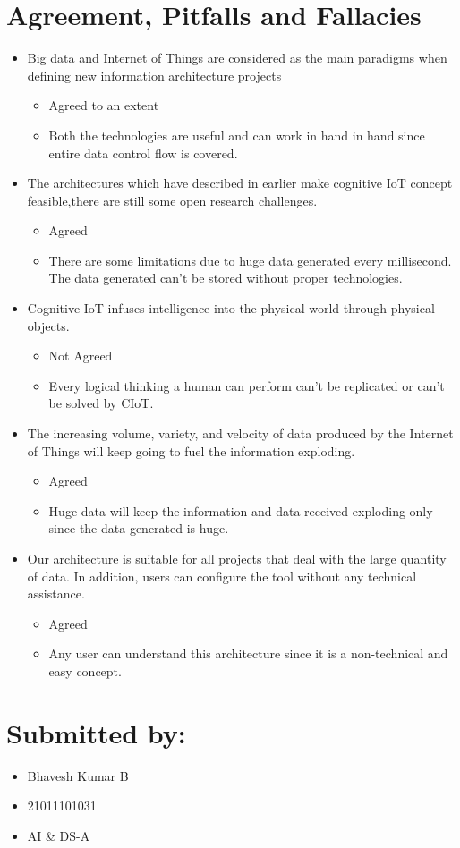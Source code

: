 \documentclass{article}
\begin{document}
\section{Agreement, Pitfalls and Fallacies}
\begin{itemize}
    \item{Big data and Internet of Things are considered as the main paradigms when defining new information architecture projects}
    \begin{itemize}
        \item{Agreed to an extent}
        \item{Both the technologies are useful and can work in hand in hand since entire data control flow is covered.}
    \end{itemize}
    \item{The architectures which have described in earlier make cognitive IoT concept feasible,there are still some open research challenges.}
    \begin{itemize}
        \item{Agreed}
        \item{There are some limitations due to huge data generated every millisecond. The data generated can't be stored without proper technologies.}
    \end{itemize}
    \item{Cognitive IoT infuses intelligence into the physical world through physical objects.}
    \begin{itemize}
        \item{Not Agreed}
        \item{Every logical thinking a human can perform can't be replicated or can't be solved by CIoT.}
    \end{itemize}
    \item{The increasing volume, variety, and velocity of data produced by the Internet of Things will keep going to fuel the information exploding.}
    \begin{itemize}
        \item{Agreed}
        \item{Huge data will keep the information and data received exploding only since the data generated is huge.}
    \end{itemize}
    \item{Our architecture is suitable for all projects that deal with the large quantity of data. In addition, users can configure the tool without any technical assistance.}
    \begin{itemize}
        \item{Agreed}
        \item{Any user can understand this architecture since it is a non-technical and easy concept.}
    \end{itemize}
\end{itemize}
\section{Submitted by:}
\begin{itemize}
    \item {Bhavesh Kumar B}
    \item{21011101031}
    \item{AI & DS-A}
\end{itemize}
\end{document}
